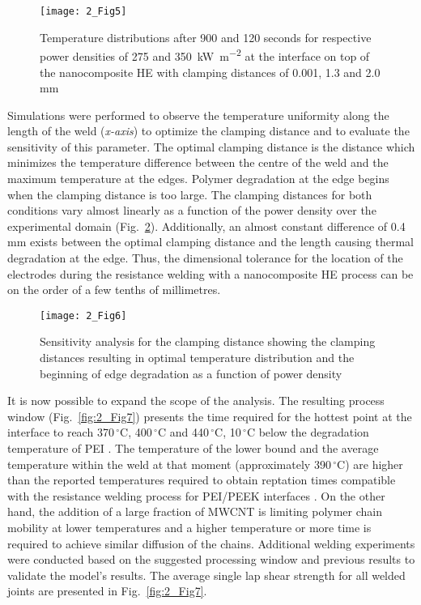 \begin{figure}[ht]
	\centering
	\texttt{[image: 2\_Fig5]}
	\caption{Temperature distributions after 900 and 120 seconds for respective power densities of 275 and \SI{350}{\kilo\watt\per\square\metre} at the interface on top of the nanocomposite HE with clamping distances of 0.001, 1.3 and 2.0 mm \cite{Brassard2019b}}
	\label{fig:2_Fig5}
\end{figure} 

\FloatBarrier
Simulations were performed to observe the temperature uniformity along the length of the weld (\textit{x-axis}) to optimize the clamping distance and to evaluate the sensitivity of this parameter. 
The optimal clamping distance is the distance which minimizes the temperature difference between the centre of the weld and the maximum temperature at the edges. 
Polymer degradation at the edge begins when the clamping distance is too large. 
The clamping distances for both conditions vary almost linearly as a function of the power density over the experimental domain (\mbox{Fig.~\ref{fig:2_Fig6}}). 
Additionally, an almost constant difference of \mbox{0.4\,mm} exists between the optimal clamping distance and the length causing thermal degradation at the edge. 
Thus, the dimensional tolerance for the location of the electrodes during the resistance welding with a nanocomposite HE process can be on the order of a few tenths of millimetres. 

\begin{figure}[ht]
	\centering
	\texttt{[image: 2\_Fig6]}
	\caption{Sensitivity analysis for the clamping distance showing the clamping distances resulting in optimal temperature distribution and the beginning of edge degradation as a function of power density \cite{Brassard2019b}}
	\label{fig:2_Fig6}
\end{figure} 

It is now possible to expand the scope of the analysis. 
The resulting process window (\mbox{Fig.~\ref{fig:2_Fig7}}) presents the time required for the hottest point at the interface to reach \mbox{370\,$^{\circ}$C}, \mbox{400\,$^{\circ}$C} and \mbox{440\,$^{\circ}$C}, \mbox{10\,$^{\circ}$C} below the degradation temperature of PEI \cite{Carroccio2000}. 
The temperature of the lower bound and the average temperature within the weld at that moment (approximately \mbox{390\,$^{\circ}$C}) are higher than the reported temperatures required to obtain reptation times compatible with the resistance welding process for PEI/PEEK interfaces \cite{Bastien1991}. 
On the other hand, the addition of a large fraction of MWCNT is limiting polymer chain mobility at lower temperatures \cite{Mu2009,Kabanemi2010} and a higher temperature or more time is required to achieve similar diffusion of the chains. 
Additional welding experiments were conducted based on the suggested processing window and previous results to validate the model’s results. 
The average single lap shear strength for all welded joints are presented in \mbox{Fig.~\ref{fig:2_Fig7}}.  

